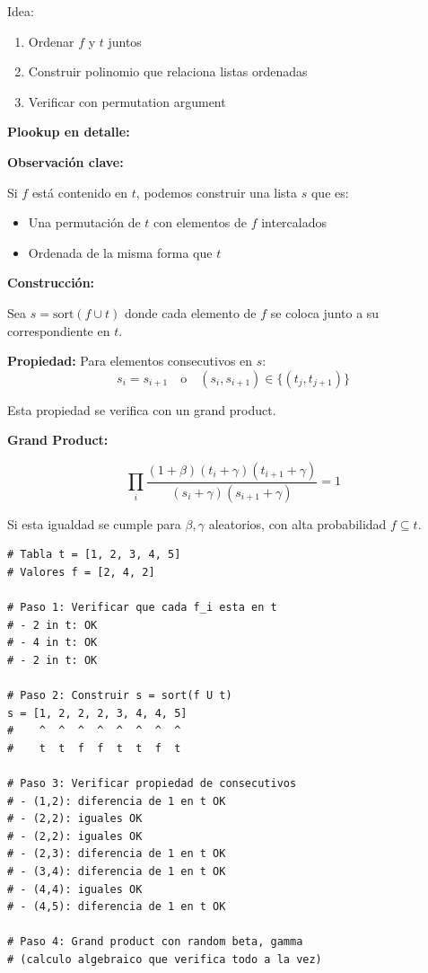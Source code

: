 \documentclass[11pt,a4paper,twoside]{book}
\begin{document}
Idea:
\begin{enumerate}
    \item Ordenar $f$ y $t$ juntos
    \item Construir polinomio que relaciona listas ordenadas
    \item Verificar con permutation argument
\end{enumerate}

\begin{mathnote}
\textbf{Plookup en detalle:}

\textbf{Observaci\'on clave:}

Si $f$ est\'a contenido en $t$, podemos construir una lista $s$ que es:
\begin{itemize}
    \item Una permutaci\'on de $t$ con elementos de $f$ intercalados
    \item Ordenada de la misma forma que $t$
\end{itemize}

\textbf{Construcci\'on:}

Sea $s = \text{sort}(f \cup t)$ donde cada elemento de $f$ se coloca junto a su correspondiente en $t$.

\textbf{Propiedad:} Para elementos consecutivos en $s$:
\[ s_i = s_{i+1} \quad \text{o} \quad (s_i, s_{i+1}) \in \{(t_j, t_{j+1})\} \]

Esta propiedad se verifica con un grand product.

\textbf{Grand Product:}

\[ \prod_{i} \frac{(1 + \beta)(t_i + \gamma)(t_{i+1} + \gamma)}{(s_i + \gamma)(s_{i+1} + \gamma)} = 1 \]

Si esta igualdad se cumple para $\beta, \gamma$ aleatorios, con alta probabilidad $f \subseteq t$.
\end{mathnote}

\begin{example}
\begin{lstlisting}[style=python]
# Tabla t = [1, 2, 3, 4, 5]
# Valores f = [2, 4, 2]

# Paso 1: Verificar que cada f_i esta en t
# - 2 in t: OK
# - 4 in t: OK
# - 2 in t: OK

# Paso 2: Construir s = sort(f U t)
s = [1, 2, 2, 2, 3, 4, 4, 5]
#    ^  ^  ^  ^  ^  ^  ^  ^
#    t  t  f  f  t  t  f  t

# Paso 3: Verificar propiedad de consecutivos
# - (1,2): diferencia de 1 en t OK
# - (2,2): iguales OK
# - (2,2): iguales OK
# - (2,3): diferencia de 1 en t OK
# - (3,4): diferencia de 1 en t OK
# - (4,4): iguales OK
# - (4,5): diferencia de 1 en t OK

# Paso 4: Grand product con random beta, gamma
# (calculo algebraico que verifica todo a la vez)
\end{lstlisting}
\end{example}
\end{document}
